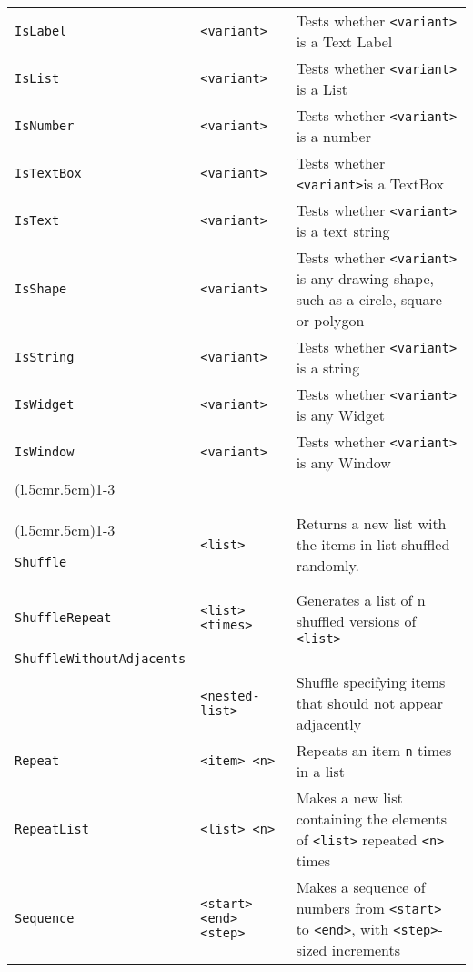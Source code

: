\begin{longtable}{p{3cm}p{3cm}p{6cm}}
\verb+IsLabel+ & \verb+<variant>+ & Tests whether \verb+<variant>+ is a Text Label\\ 
\verb+IsList+ & \verb+<variant>+ & Tests whether \verb+<variant>+ is a List\\ 
\verb+IsNumber+ & \verb+<variant>+ & Tests whether \verb+<variant>+ is a number \\ 
\verb+IsTextBox+ & \verb+<variant>+ & Tests whether \verb+<variant>+is a TextBox\\ 
\verb+IsText+ & \verb+<variant>+ & Tests whether \verb+<variant>+ is a text string\\ 
\verb+IsShape+ & \verb+<variant>+ & Tests whether \verb+<variant>+ is any drawing shape, such as a circle, square or polygon\\ 
\verb+IsString+ & \verb+<variant>+ & Tests whether \verb+<variant>+ is a string\\ 
\verb+IsWidget+ & \verb+<variant>+ & Tests whether \verb+<variant>+ is any Widget\\ 
\verb+IsWindow+ & \verb+<variant>+ & Tests whether \verb+<variant>+ is any Window\\ 


\addlinespace[0.2cm] 

\cmidrule(l{.5cm}r{.5cm}){1-3} 
\multicolumn{3}{c}{\textbf{List Manipulation Functions}}\\ 
\cmidrule(l{.5cm}r{.5cm}){1-3} 

\verb+Shuffle+ & \verb+<list>+ & Returns a new list with the items in list shuffled randomly. \\ 

\verb+ShuffleRepeat+&\verb+<list>+ \verb+<times>+&Generates a list of {{{n}}} shuffled versions of \verb+<list>+\\
\verb+ShuffleWithoutAdjacents+\\
&\verb+<nested-list>+&Shuffle specifying items that should not appear adjacently\\
\verb+Repeat+ & \verb+<item> <n>+& Repeats an item \verb+n+ times in a list\\ 
\verb+RepeatList+ & \verb+<list> <n>+ & Makes a new list containing 
the elements of \verb+<list>+ repeated \verb+<n>+ times\\ 
\verb+Sequence+ & \verb+<start>+ \verb+<end>+ \verb+<step>+ & Makes a sequence of numbers 
from \verb+<start>+ to \verb+<end>+, with \verb+<step>+-sized increments\\ 


\end{longtable}
